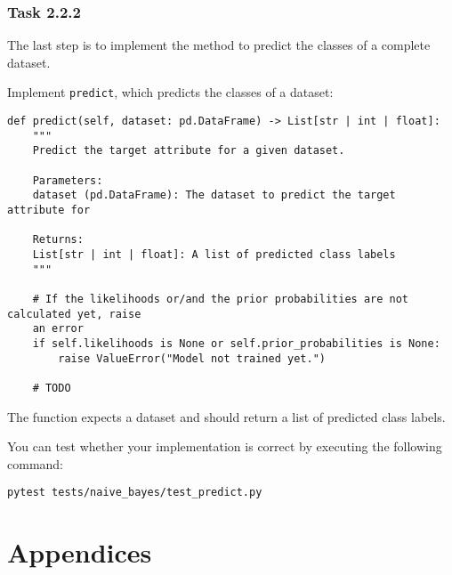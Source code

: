 \documentclass[
english,
smallborders
]{i6prcsht}
\begin{document}
\subsubsection*{Task 2.2.2}

The last step is to implement the method to predict the classes of a complete dataset.

Implement \texttt{predict}, which predicts the classes of a dataset:

\vspace*{0.3cm}

\begin{lstlisting}
def predict(self, dataset: pd.DataFrame) -> List[str | int | float]:
	"""
	Predict the target attribute for a given dataset.

	Parameters:
	dataset (pd.DataFrame): The dataset to predict the target attribute for

	Returns:
	List[str | int | float]: A list of predicted class labels
	"""

	# If the likelihoods or/and the prior probabilities are not calculated yet, raise
	an error
	if self.likelihoods is None or self.prior_probabilities is None:
		raise ValueError("Model not trained yet.")

	# TODO
\end{lstlisting}

\vspace*{0.1cm}

The function expects a dataset and should return a list of predicted class labels.

You can test whether your implementation is correct by executing the following command:

\vspace*{0.3cm}

\begin{lstlisting}
pytest tests/naive_bayes/test_predict.py
\end{lstlisting}

\vspace*{0.1cm}











\newpage

\section*{Appendices}
\end{document}
